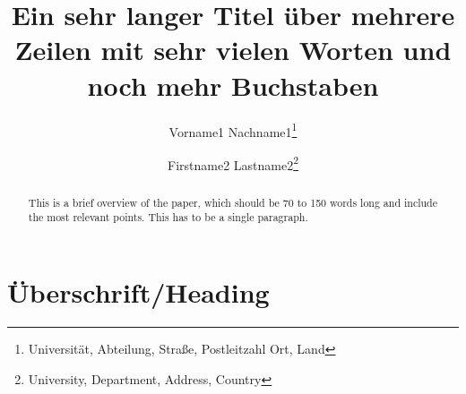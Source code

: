 \documentclass[]{lni}
\begin{document}
\title[Ein Kurztitel]{Ein sehr langer Titel über mehrere Zeilen mit sehr vielen
Worten und noch mehr Buchstaben}
\author[Vorname1 Nachname1 \and Firstname2 Lastname2]
{Vorname1 Nachname1\footnote{Universität, Abteilung, Straße, Postleitzahl Ort,
Land } \and
Firstname2 Lastname2\footnote{University, Department, Address, Country
}}
\maketitle

\begin{abstract}
This is a brief overview of the paper, which should be 70 to 150 words long and
include the most relevant points. This has to be a single paragraph.
\end{abstract}
\section{Überschrift/Heading}

\end{document}
